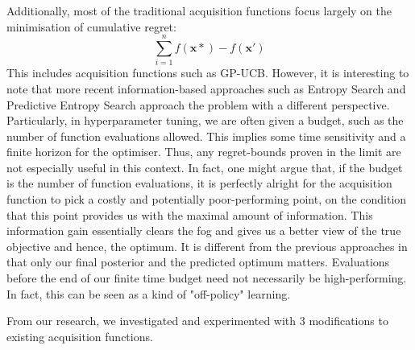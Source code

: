 \documentclass[letterpaper]{article}
\begin{document}
Additionally, most of the traditional acquisition functions focus largely on the
minimisation of cumulative regret:
$$\sum_{i=1}^{n} f(\textbf{x}*) - f(\textbf{x}')$$
This includes acquisition functions such as GP-UCB. However, it is interesting
to note that more recent information-based approaches such as Entropy Search
\cite{hennig2012entropy} and Predictive Entropy Search \cite{hernandez2014predictive}
approach the problem with a different perspective.
Particularly, in hyperparameter tuning, we are often given a budget,
such as the number of function evaluations allowed. This implies some time sensitivity
and a finite horizon for the optimiser. Thus, any regret-bounds proven in the limit
are not especially useful in this context. In fact, one might argue that, if the
budget is the number of function evaluations, it is perfectly alright for the
acquisition function to pick a costly and potentially poor-performing point,
on the condition that this point provides us with the maximal amount of information.
This information gain essentially clears the fog and gives us a better view of the
true objective and hence, the optimum. It is different from the previous approaches
in that only our final posterior and the predicted optimum matters. Evaluations
before the end of our finite time budget need not necessarily be high-performing.
In fact, this can be seen as a kind of "off-policy" learning.

From our research, we investigated and experimented with 3 modifications to existing
acquisition functions.
\end{document}
